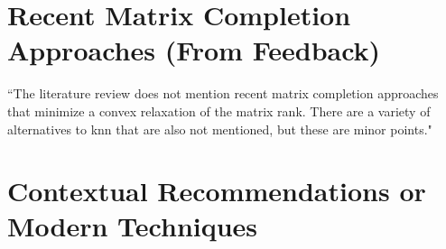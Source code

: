 

\section{Recent Matrix Completion Approaches (From Feedback)}
``The literature review does not mention recent matrix completion approaches that minimize a convex relaxation of the matrix rank. There are a variety of alternatives to knn that are also not mentioned, but these are minor points."

\section{Contextual Recommendations or Modern Techniques}



